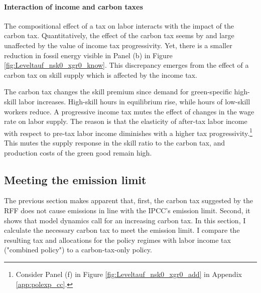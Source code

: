  
  
\paragraph{Interaction of income and carbon taxes}
The compositional effect of a tax on labor interacts with the impact of the carbon tax.
  Quantitatively, the effect of the carbon tax seems by and large unaffected by the value of income tax progressivity.
 Yet, there is a smaller reduction in fossil energy visible in Panel (b) in Figure \ref{fig:Leveltauf_nsk0_xgr0_know}.
This discrepancy emerges from the effect of a carbon tax on skill supply which is affected by the income tax. 

    The carbon tax changes the skill premium since demand for green-specific high-skill labor increases. High-skill hours in equilibrium rise, while hours of low-skill workers reduce.  A progressive income tax mutes the effect of changes in the wage rate on labor supply. The reason is that the elasticity of after-tax labor income with respect to pre-tax labor income diminishes with a higher tax progressivity.\footnote{Consider Panel (f) in Figure \ref{fig:Leveltauf_nsk0_xgr0_add} in Appendix \ref{app:polexp_cc}.} This mutes the supply response in the skill ratio to the carbon tax, and production costs of the green good remain high.
   
  
\subsection{Meeting the emission limit}\label{subsec:meetlim}
 
The previous section makes apparent that, first, the carbon tax suggested by the RFF does not cause emissions in line with the IPCC's emission limit.  Second, it shows that model dynamics call for an increasing carbon tax. In this section, I calculate the necessary carbon tax to meet the emission limit. I compare the resulting tax and allocations for the policy regimes with labor income tax ("combined policy") to a carbon-tax-only policy.
 

